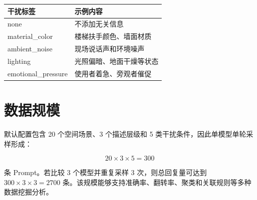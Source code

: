 \begin{table}[htbp]
    \centering
    \begin{tabular}{ll}
        \toprule
        干扰标签 & 示例内容 \\
        \midrule
        none & 不添加无关信息 \\
        material\_color & 楼梯扶手颜色、墙面材质 \\
        ambient\_noise & 现场说话声和环境噪声 \\
        lighting & 光照偏暗、地面干燥等状态 \\
        emotional\_pressure & 使用者着急、旁观者催促 \\
        \bottomrule
    \end{tabular}
    \label{tab:noise}
\end{table}

\section{数据规模}

默认配置包含 20 个空间场景、3 个描述层级和 5 类干扰条件，因此单模型单轮采样形成：

\begin{equation}
20 \times 3 \times 5 = 300
\label{eq:prompt-size}
\end{equation}

条 Prompt。若比较 3 个模型并重复采样 3 次，则总回复量可达到 $300 \times 3 \times 3 = 2700$ 条。该规模能够支持准确率、翻转率、聚类和关联规则等多种数据挖掘分析。
